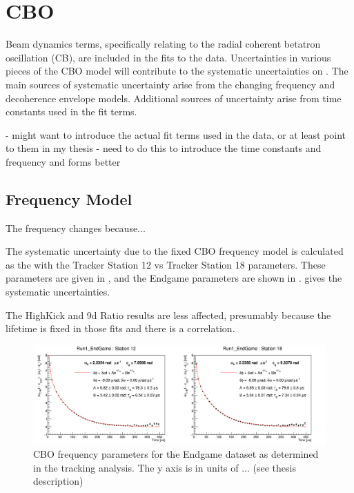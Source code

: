 
\graphicspath{{Body/Figures/CBO/}{Body/Figures/CBO/Frequency/}{Body/Figures/CBO/TimeConstants/}}

\clearpage
\section{CBO}


Beam dynamics terms, specifically relating to the radial coherent betatron oscillation (CB), are included in the fits to the data. Uncertainties in various pieces of the CBO model will contribute to the systematic uncertainties on \R. The main sources of systematic uncertainty arise from the changing frequency and decoherence envelope models. Additional sources of uncertainty arise from time constants used in the fit terms.


- might want to introduce the actual fit terms used in the data, or at least point to them in my thesis - need to do this to introduce the time constants and frequency and forms better


\subsection{Frequency Model}


The frequency changes because...

The systematic uncertainty due to the fixed CBO frequency model is calculated as the \DR with the Tracker Station 12 vs Tracker Station 18 parameters. These parameters are given in , and the Endgame parameters are shown in .  gives the systematic uncertainties.

The HighKick and 9d Ratio results are less affected, presumably because the lifetime is fixed in those fits and there is a correlation.


\begin{figure}[h]
    \centering
    \includegraphics[width=\textwidth]{Run1_EndGame_CBOFreq}
    \caption[]{CBO frequency parameters for the Endgame dataset as determined in the tracking analysis. The y axis is in units of ... (see thesis description)}
    \label{fig:CBOFreq}
\end{figure}


